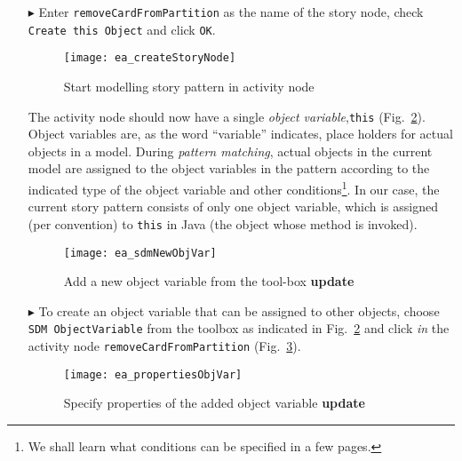 \begin{itemize}
\item[$\blacktriangleright$] Enter \texttt{remove\-Card\-From\-Partition} as the name of the story node, check \texttt{Create this Object} and click
\texttt{OK}.

\begin{figure}[htpb]
\begin{center} 
  \texttt{[image: ea\_createStoryNode]}
  \caption{Start modelling story pattern in activity node}  
  \label{fig:story_pattern}
\end{center}
\end{figure}

The activity node should now have a single \emph{object variable},\texttt{this} (Fig.~\ref{fig:tool_box}). Object variables are, as
the word ``variable'' indicates, place holders for actual objects in a model.  During \emph{pattern matching}, actual objects in the 
current model are assigned to the object variables in the pattern according to  the indicated type of the object variable and other conditions\footnote{We shall
learn what conditions can be specified in a few pages.}.  In our case, the current story pattern consists of only one object variable, which is assigned (per
convention) to \texttt{this} in Java (the object whose method is invoked).

\begin{figure}[htp]
\begin{center}
  \texttt{[image: ea\_sdmNewObjVar]}
  \caption{Add a new object variable from the tool-box {\bf update}}  
  \label{fig:tool_box}
\end{center}
\end{figure}

\item[$\blacktriangleright$] To create an object variable that can be assigned to other objects, choose \texttt{SDM ObjectVariable} from the toolbox as
indicated in Fig.~\ref{fig:tool_box} and click \emph{in} the activity node \texttt{removeCardFromPartition} (Fig.~\ref{fig:object_variable_properties}).

\begin{figure}[htp]
\begin{center}
  \texttt{[image: ea\_propertiesObjVar]}
  \caption{Specify properties of the added object variable {\bf update}}  
  \label{fig:object_variable_properties}
\end{center}
\end{figure}


\end{itemize}
